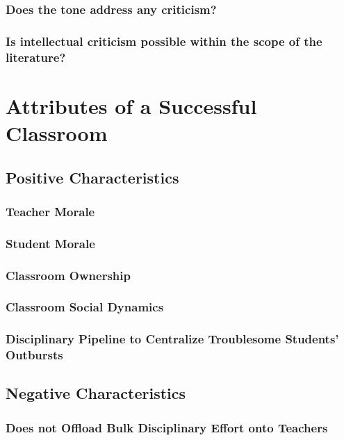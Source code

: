 \documentclass[12pt]{article}
\begin{document}
	\subsubsection{Does the tone address any criticism?}
	\subsubsection{Is intellectual criticism possible within the scope of the literature?}
	
	\section{Attributes of a Successful Classroom}
	\subsection{Positive Characteristics}
	\subsubsection{Teacher Morale}
	\subsubsection{Student Morale}
	\subsubsection{Classroom Ownership}
	\subsubsection{Classroom Social Dynamics}
	\subsubsection{Disciplinary Pipeline to Centralize Troublesome Students' Outbursts}
	\subsection{Negative Characteristics}
	\subsubsection{Does not Offload Bulk Disciplinary Effort onto Teachers}
\end{document}
